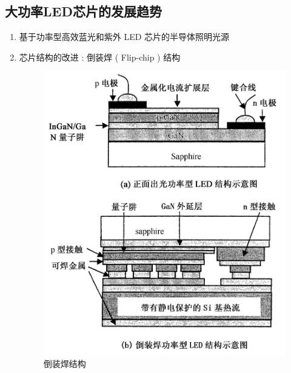 \begin{enumerate}
\section{大功率LED芯片的发展趋势\cite{powerled1}}
\begin{enumerate}

\item 基于功率型高效蓝光和紫外 LED 芯片的半导体照明光源

\item 芯片结构的改进 : 倒装焊 ( Flip-chip ) 结构

\begin{figure}[H]
\centering
\includegraphics[scale=0.2]{led3.png}
\caption{倒装焊结构}
\label{led3}
\end{figure}

\end{enumerate}

\end{enumerate}

\newpage


